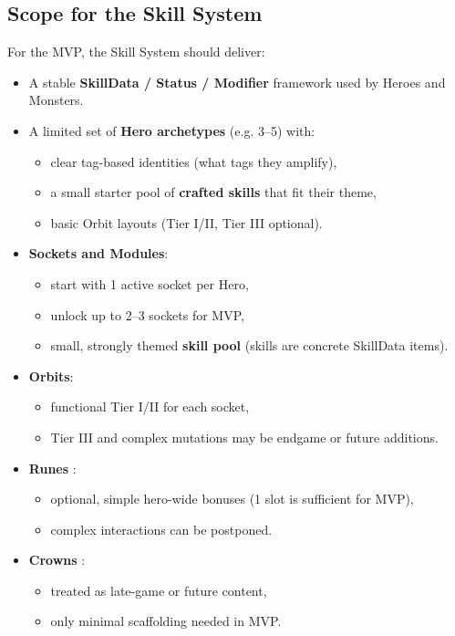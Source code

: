 \subsection{Scope for the Skill System}

For the MVP, the Skill System should deliver:

\begin{itemize}
	\item A stable \textbf{SkillData / Status / Modifier} framework used by Heroes and Monsters.
	\item A limited set of \textbf{Hero archetypes} (e.g. 3--5) with:
	\begin{itemize}
		\item clear tag-based identities (what tags they amplify),
		\item a small starter pool of \textbf{crafted skills} that fit their theme,
		\item basic Orbit layouts (Tier I/II, Tier III optional).
	\end{itemize}
	\item \textbf{Sockets and Modules}:
	\begin{itemize}
		\item start with 1 active socket per Hero,
		\item unlock up to 2--3 sockets for MVP,
		\item small, strongly themed \textbf{skill pool} (skills are concrete SkillData items).
	\end{itemize}
	\item \textbf{Orbits}:
	\begin{itemize}
		\item functional Tier I/II for each socket,
		\item Tier III and complex mutations may be endgame or future additions.
	\end{itemize}
	\item \textbf{Runes} :
	\begin{itemize}
		\item optional, simple hero-wide bonuses (1 slot is sufficient for MVP),
		\item complex interactions can be postponed.
	\end{itemize}
	\item \textbf{Crowns} :
	\begin{itemize}
		\item treated as late-game or future content,
		\item only minimal scaffolding needed in MVP.
	\end{itemize}
\end{itemize}

